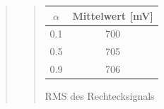 \begin{quote}
\begin{quote}
            \begin{center}
                  \begin{tabular}{|c|c|}
                  \hline
                   $\alpha $ &  Mittelwert [mV] \\ \hline 
                   0.1 &  700 \\ \hline
                   0.5 &  705 \\ \hline
                   0.9 &  706 \\ \hline           
                 \end{tabular}
                       \caption{RMS des Rechtecksignals}
                        \label{tablelabel1}
                        
            \end{center}
        
    \end{quote}


    
    


    
        
\end{quote}


